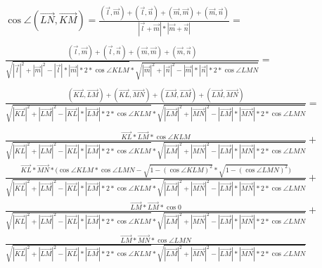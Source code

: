 		\begin{gather*} 
			\cos \angle (\overrightarrow{LN}, \overrightarrow{KM}) = \frac{(\overrightarrow{l}, \overrightarrow{m}) + (\overrightarrow{l}, \overrightarrow{n}) + (\overrightarrow{m}, \overrightarrow{m}) + (\overrightarrow{m}, \overrightarrow{n})}{|\overrightarrow{l} + \overrightarrow{m}|*|\overrightarrow{m} + \overrightarrow{n}|} = 
			\\ \\
			\frac{(\overrightarrow{l}, \overrightarrow{m}) + (\overrightarrow{l}, \overrightarrow{n}) + (\overrightarrow{m}, \overrightarrow{m}) + (\overrightarrow{m}, \overrightarrow{n})}{	\sqrt{|\overrightarrow{l}|^2 + |\overrightarrow{m}|^2 - |\overrightarrow{l}|*|\overrightarrow{m}|*2*\cos\angle KLM}*\sqrt{|\overrightarrow{m}|^2 + |\overrightarrow{n}|^2 - |\overrightarrow{m}|*|\overrightarrow{n}|*2*\cos\angle LMN}} = 
			\\ \\
			\frac{(\overrightarrow{KL}, \overrightarrow{LM}) + (\overrightarrow{KL}, \overrightarrow{MN}) + (\overrightarrow{LM}, \overrightarrow{LM}) + (\overrightarrow{LM}, \overrightarrow{MN})}{	\sqrt{|\overrightarrow{KL}|^2 + |\overrightarrow{LM}|^2 - |\overrightarrow{KL}|*|\overrightarrow{LM}|*2*\cos\angle KLM}*\sqrt{|\overrightarrow{LM}|^2 + |\overrightarrow{MN}|^2 - |\overrightarrow{LM}|*|\overrightarrow{MN}|*2*\cos\angle LMN}} = 
			\\ \\
			\frac{\overrightarrow{KL} * \overrightarrow{LM} * \cos\angle KLM}{\sqrt{|\overrightarrow{KL}|^2 + |\overrightarrow{LM}|^2 - |\overrightarrow{KL}|*|\overrightarrow{LM}|*2*\cos\angle KLM}*\sqrt{|\overrightarrow{LM}|^2 + |\overrightarrow{MN}|^2 - |\overrightarrow{LM}|*|\overrightarrow{MN}|*2*\cos\angle LMN}} + 
			\\
			\frac{\overrightarrow{KL} * \overrightarrow{MN} * \biggl( \cos \angle KLM * \cos \angle LMN - \sqrt{1 - (\cos \angle KLM)^2} * \sqrt{1 - (\cos \angle LMN)^2} \biggl)}{\sqrt{|\overrightarrow{KL}|^2 + |\overrightarrow{LM}|^2 - |\overrightarrow{KL}|*|\overrightarrow{LM}|*2*\cos\angle KLM}*\sqrt{|\overrightarrow{LM}|^2 + |\overrightarrow{MN}|^2 - |\overrightarrow{LM}|*|\overrightarrow{MN}|*2*\cos\angle LMN}} + 
			\\
			\frac{\overrightarrow{LM} * \overrightarrow{LM} * \cos{0}}{\sqrt{|\overrightarrow{KL}|^2 + |\overrightarrow{LM}|^2 - |\overrightarrow{KL}|*|\overrightarrow{LM}|*2*\cos\angle KLM}*\sqrt{|\overrightarrow{LM}|^2 + |\overrightarrow{MN}|^2 - |\overrightarrow{LM}|*|\overrightarrow{MN}|*2*\cos\angle LMN}} + 
			\\
			\frac{\overrightarrow{LM} * \overrightarrow{MN} * \cos\angle LMN}{\sqrt{|\overrightarrow{KL}|^2 + |\overrightarrow{LM}|^2 - |\overrightarrow{KL}|*|\overrightarrow{LM}|*2*\cos\angle KLM}*\sqrt{|\overrightarrow{LM}|^2 + |\overrightarrow{MN}|^2 - |\overrightarrow{LM}|*|\overrightarrow{MN}|*2*\cos\angle LMN}} 
			\\
		\end{gather*} 